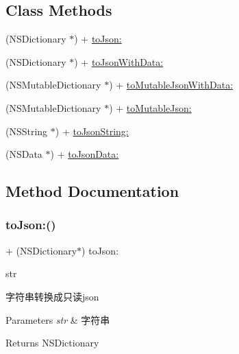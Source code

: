 \subsection*{Class Methods}
\begin{DoxyCompactItemize}
\item 
(N\+S\+Dictionary $\ast$) + \mbox{\hyperlink{interface_json_utils_ab51306c14fb82491d0774166aca72129}{to\+Json\+:}}
\item 
(N\+S\+Dictionary $\ast$) + \mbox{\hyperlink{interface_json_utils_a9165a0ed9fba5546cadc3add89b25712}{to\+Json\+With\+Data\+:}}
\item 
(N\+S\+Mutable\+Dictionary $\ast$) + \mbox{\hyperlink{interface_json_utils_a22779aabf7a0add657d6d2f3522fea43}{to\+Mutable\+Json\+With\+Data\+:}}
\item 
(N\+S\+Mutable\+Dictionary $\ast$) + \mbox{\hyperlink{interface_json_utils_a2f225625dae276cff87320b4f6808f33}{to\+Mutable\+Json\+:}}
\item 
(N\+S\+String $\ast$) + \mbox{\hyperlink{interface_json_utils_a2b3a0fbb19e8243047386b6650a2d8b8}{to\+Json\+String\+:}}
\item 
(N\+S\+Data $\ast$) + \mbox{\hyperlink{interface_json_utils_a157ae00d3d98c0f9981c30c3dd04137b}{to\+Json\+Data\+:}}
\end{DoxyCompactItemize}


\subsection{Method Documentation}
\mbox{\label{interface_json_utils_ab51306c14fb82491d0774166aca72129}} 
\subsubsection{\texorpdfstring{to\+Json\+:()}{toJson:()}}
{\footnotesize\ttfamily + (N\+S\+Dictionary$\ast$) to\+Json\+: \begin{DoxyParamCaption}\item[{(N\+S\+String $\ast$)}]{str }\end{DoxyParamCaption}}

字符串转换成只读json 
\begin{DoxyParams}{Parameters}
{\em str} & 字符串 \\
\hline
\end{DoxyParams}
\begin{DoxyReturn}{Returns}
N\+S\+Dictionary 
\end{DoxyReturn}
\mbox{\label{interface_json_utils_a157ae00d3d98c0f9981c30c3dd04137b}} 
